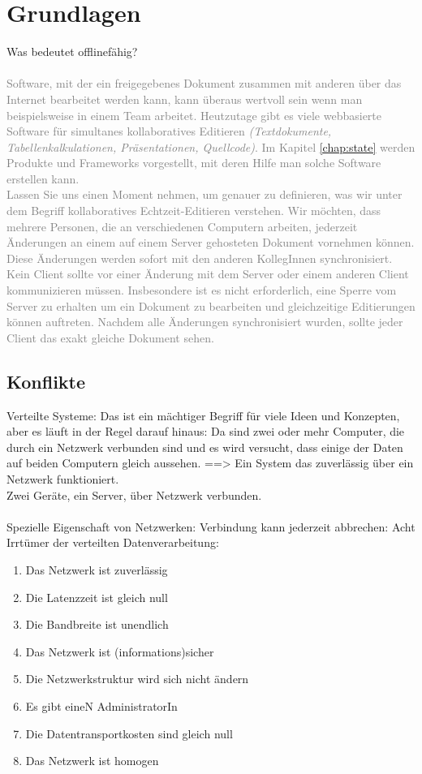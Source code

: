 \chapter{\label{chap:grundlagen}Grundlagen}
Was bedeutet offlinefähig?\\\\
\textcolor{gray}{Software, mit der ein freigegebenes Dokument zusammen mit anderen über das Internet bearbeitet werden kann, kann überaus wertvoll sein wenn man beispielsweise in einem Team arbeitet. Heutzutage gibt es viele webbasierte Software für simultanes kollaboratives Editieren \textit{(Textdokumente, Tabellenkalkulationen, Präsentationen, Quellcode)}. Im Kapitel \ref{chap:state} werden Produkte und Frameworks vorgestellt, mit deren Hilfe man solche Software erstellen kann.\\
  Lassen Sie uns einen Moment nehmen, um genauer zu definieren, was wir unter dem Begriff kollaboratives Echtzeit-Editieren verstehen.
Wir möchten, dass mehrere Personen, die an verschiedenen Computern arbeiten, jederzeit Änderungen an einem auf einem Server gehosteten Dokument vornehmen können. Diese Änderungen werden sofort mit den anderen KollegInnen synchronisiert. Kein Client sollte vor einer Änderung mit dem Server oder einem anderen Client kommunizieren müssen. Insbesondere ist es nicht erforderlich, eine Sperre vom Server zu erhalten um ein Dokument zu bearbeiten und gleichzeitige Editierungen können auftreten. Nachdem alle Änderungen synchronisiert wurden, sollte jeder Client das exakt gleiche Dokument sehen.}
%
%
\section{\label{sec:conflict}Konflikte}
Verteilte Systeme: Das ist ein mächtiger Begriff für viele Ideen und Konzepten, aber es läuft in der Regel darauf hinaus: Da sind zwei oder mehr Computer, die durch ein Netzwerk verbunden sind und es wird versucht, dass einige der Daten auf beiden Computern gleich aussehen. ==> Ein System das zuverlässig über ein Netzwerk funktioniert.\\
Zwei Geräte, ein Server, über Netzwerk verbunden.\\\\
Spezielle Eigenschaft von Netzwerken: Verbindung kann jederzeit abbrechen:
Acht Irrtümer der verteilten Datenverarbeitung:
\begin{enumerate}
  \item Das Netzwerk ist zuverlässig
  \item Die \gls{Latenz}zeit ist gleich null
  \item Die Bandbreite ist unendlich
  \item Das Netzwerk ist (informations)sicher
  \item Die Netzwerkstruktur wird sich nicht ändern
  \item Es gibt eineN AdministratorIn
  \item Die Datentransportkosten sind gleich null
  \item Das Netzwerk ist homogen
\end{enumerate}

